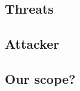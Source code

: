 \subsection{Threats}
\subsection{Attacker}

\subsection{Our scope?}

\begin{comment}
Basic Steps
\begin{enumerate}
    \item Identify assets
    \item Determine vulnerabilities
    \item Estimate likelihood of exploitation
    \item Calculate consequences (typically as expected annual loss)
    \item Survey applicable controls and their costs
    \item Project annual savings of control
\end{enumerate}

\subsection{Identify assets}
Logdata

\subsection{Determine vulnerabilities}
\begin{table}[h!]
\centering
\caption{My caption}
\label{my-label}
\begin{tabular}{l|l|l|l}
\multicolumn{1}{c|}{} & \multicolumn{1}{c|}{Confidentiality} & \multicolumn{1}{c|}{Integrity} & \multicolumn{1}{c}{Availability} \\ \hline
Hardware              &                                      & tampered                       & stolen, destroyed                \\ \hline
Software              &                                      & backdoor                       & deleted, license expire          \\ \hline
Data                  & disclosure, inference                & tampered                       & deleted, ransom ware            
\end{tabular}
\end{table}

\end{comment}
